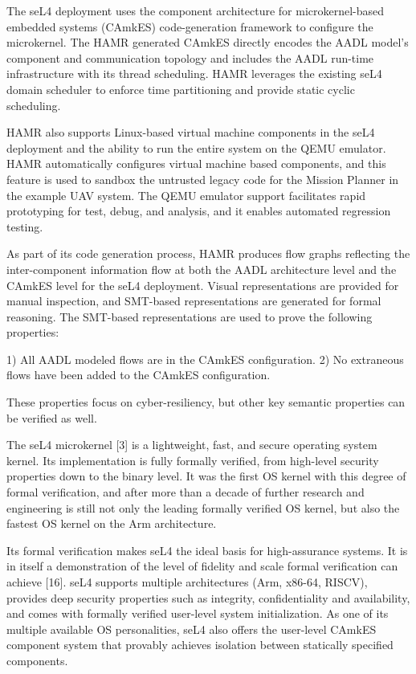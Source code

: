 The seL4 deployment uses the component architecture for microkernel-based embedded systems (CAmkES) code-generation framework to configure the microkernel. The HAMR generated CAmkES directly encodes the AADL model’s component and communication topology and includes the AADL run-time infrastructure with its thread scheduling. HAMR leverages the existing seL4 domain scheduler to enforce time partitioning and provide static cyclic scheduling. 

HAMR also supports Linux-based virtual machine components in the seL4 deployment and the ability to run the entire system on the QEMU emulator. HAMR automatically configures virtual machine based components, and this feature is used to sandbox the untrusted legacy code for the Mission Planner in the example UAV system. The QEMU emulator support facilitates rapid prototyping for test, debug, and analysis, and it enables automated regression testing. 

As part of its code generation process, HAMR produces flow graphs reflecting the inter-component information flow at both the AADL architecture level and the CAmkES level for the seL4 deployment. Visual representations are provided for manual inspection, and SMT-based representations are generated for formal reasoning. The SMT-based representations are used to prove the following properties:

1) All AADL modeled flows are in the CAmkES configuration. 
2) No extraneous flows have been added to the CAmkES configuration. 

These properties focus on cyber-resiliency, but other key semantic properties can be verified as well.

The seL4 microkernel [3] is a lightweight, fast, and secure operating system kernel. Its implementation is fully formally verified, from high-level security properties down to the binary level. It was the first OS kernel with this degree of formal verification, and after more than a decade of further research and engineering is still not only the leading formally verified OS kernel, but also the fastest OS kernel on the Arm architecture. 

Its formal verification makes seL4 the ideal basis for high-assurance systems. It is in itself a demonstration of the level of fidelity and scale formal verification can achieve [16]. seL4 supports multiple architectures (Arm, x86-64, RISCV), provides deep security properties such as integrity, confidentiality and availability, and comes with formally verified user-level system initialization. As one of its multiple available OS personalities, seL4 also offers the user-level CAmkES component system that provably achieves isolation between statically specified components. 

